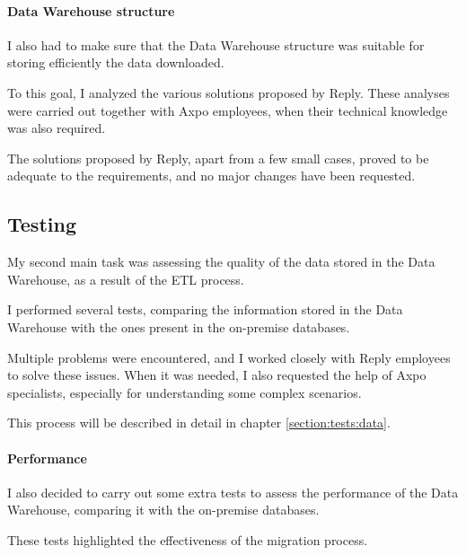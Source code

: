     \paragraph{Data Warehouse structure}
        I also had to make sure that the Data Warehouse structure was suitable for storing efficiently the data downloaded.
        
        To this goal, I analyzed the various solutions proposed by Reply.
        These analyses were carried out together with Axpo employees, when their technical knowledge was also required.
        
        The solutions proposed by Reply, apart from a few small cases, proved to be adequate to the requirements, and no major changes have been requested.
    
\subsection{Testing}
    My second main task was assessing the quality of the data stored in the Data Warehouse, as a result of the ETL process.
    
    I performed several tests, comparing the information stored in the Data Warehouse with the ones present in the on-premise databases.
    
    Multiple problems were encountered, and I worked closely with Reply employees to solve these issues.
    When it was needed, I also requested the help of Axpo specialists, especially for understanding some complex scenarios.
    
    This process will be described in detail in chapter \ref{section:tests:data}.
    
    \paragraph{Performance}
        I also decided to carry out some extra tests to assess the performance of the Data Warehouse, comparing it with the on-premise databases.
        
        These tests highlighted the effectiveness of the migration process.
    